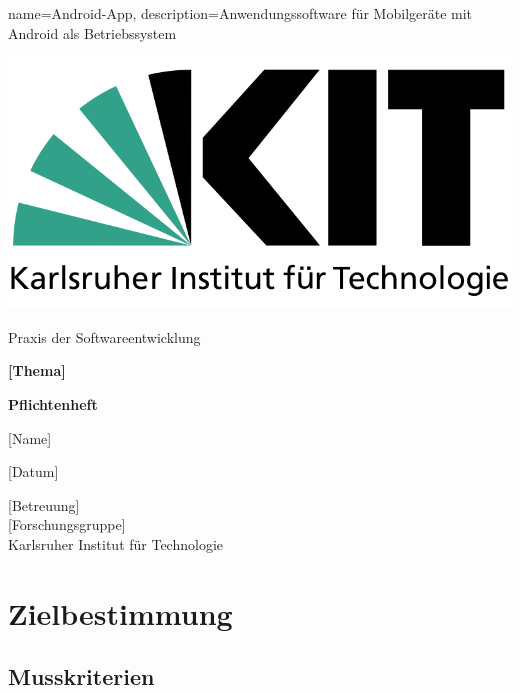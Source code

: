 \documentclass[a4paper]{scrreprt}
\begin{document}
	{name=Android-App, description={Anwendungssoftware für Mobilgeräte mit Android als Betriebssystem}}
	
    \begin{flushright}
        \includegraphics[scale = 0.2]{kit-logo.png}\\[0.5cm]
    \end{flushright}
    \vspace*{2cm}

    \begin{center} 
    		\large Praxis der Softwareentwicklung
        \vspace*{1.5cm}

        \textbf{\huge [Thema]}
        \vspace*{1cm}

        \textbf{\Large Pflichtenheft}
        \vspace*{2cm}

        [Name]
        \vspace*{1cm}

        [Datum]
        \vspace*{2.5cm}

        [Betreuung]\\[0.5cm]
        [Forschungsgruppe]\\[0.5cm]

        Karlsruher Institut für Technologie
    \end{center}
    \thispagestyle{empty}

    \tableofcontents

    \chapter{Zielbestimmung}
        \section{Musskriterien}
\end{document}

